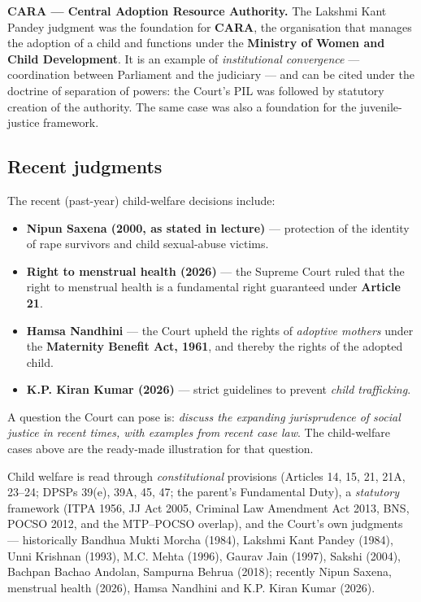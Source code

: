 \begin{GovtPolicy}
\textbf{CARA — Central Adoption Resource Authority.} The Lakshmi Kant Pandey judgment was
the foundation for \textbf{CARA}, the organisation that manages the adoption of a child
and functions under the \textbf{Ministry of Women and Child Development}. It is an
example of \emph{institutional convergence} — coordination between Parliament and the
judiciary — and can be cited under the doctrine of separation of powers: the Court's PIL
was followed by statutory creation of the authority. The same case was also a foundation
for the juvenile-justice framework.
\end{GovtPolicy}

\subsection{Recent judgments}

The recent (past-year) child-welfare decisions include:

\begin{itemize}
  \item \textbf{Nipun Saxena (2000, as stated in lecture)} — protection of the identity of
        rape survivors and child sexual-abuse victims.
  \item \textbf{Right to menstrual health (2026)} — the Supreme Court ruled that the right
        to menstrual health is a fundamental right guaranteed under \textbf{Article 21}.
  \item \textbf{Hamsa Nandhini} — the Court upheld the rights of \emph{adoptive mothers}
        under the \textbf{Maternity Benefit Act, 1961}, and thereby the rights of the
        adopted child.
  \item \textbf{K.P. Kiran Kumar (2026)} — strict guidelines to prevent \emph{child
        trafficking}.
\end{itemize}

\begin{PYQLink}
A question the Court can pose is: \emph{discuss the expanding jurisprudence of social
justice in recent times, with examples from recent case law}. The child-welfare cases
above are the ready-made illustration for that question.
\end{PYQLink}

\begin{QuickRevision}
Child welfare is read through \emph{constitutional} provisions (Articles 14, 15, 21,
21A, 23--24; DPSPs 39(e), 39A, 45, 47; the parent's Fundamental Duty), a \emph{statutory}
framework (ITPA 1956, JJ Act 2005, Criminal Law Amendment Act 2013, BNS, POCSO 2012, and
the MTP--POCSO overlap), and the Court's own judgments — historically Bandhua Mukti Morcha
(1984), Lakshmi Kant Pandey (1984), Unni Krishnan (1993), M.C. Mehta (1996), Gaurav Jain
(1997), Sakshi (2004), Bachpan Bachao Andolan, Sampurna Behrua (2018); recently Nipun
Saxena, menstrual health (2026), Hamsa Nandhini and K.P. Kiran Kumar (2026).
\end{QuickRevision}

